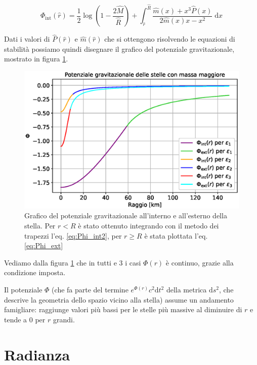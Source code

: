 \documentclass[a4paper, titlepage]{article}
\begin{document}
\begin{equation}
    \Phi_\text{int} (\hat r) =
    \frac{1}{2} \log(1 - \frac{2 \hat{M}}{\hat R}) + \int_{\hat r}^{\hat R} \frac{\hat m (x) + x^3 \hat P (x)}{2 \hat m (x) x - x^2}  \;\mathrm{d}x
    \label{eq:Phi_int2}
\end{equation}

Dati i valori di $\hat P (\hat r)$ e $\hat m (\hat r)$ che si ottengono risolvendo le equazioni di stabilità possiamo quindi disegnare il grafico del potenziale gravitazionale, mostrato in figura \ref{fig:Phi}.

\begin{figure}[h]
    \centering
    \includegraphics[width = \textwidth]{Figures/Phi.eps}
    \caption{Grafico del potenziale gravitazionale all'interno e all'esterno della stella. Per $r < R$ è stato ottenuto integrando con il metodo dei trapezzi l'eq. \ref{eq:Phi_int2}, per $r \geq R$ è stata plottata l'eq. \ref{eq:Phi_ext}}
    \label{fig:Phi}
\end{figure}

Vediamo dalla figura \ref{fig:Phi} che in tutti e 3 i casi $\Phi (r)$ è continuo, grazie alla condizione imposta.

Il potenziale $\Phi$ (che fa parte del termine $e^{\Phi (r)} c^2 \mathrm{d}t^2$ della metrica $\mathrm{d}s^2$, che descrive la geometria dello spazio vicino alla stella) assume un andamento famigliare: raggiunge valori più bassi per le stelle più massive al diminuire di $r$ e tende a 0 per $r$ grandi.




\newpage
\section{Radianza}
\end{document}
